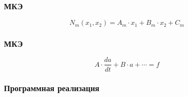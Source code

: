 \documentclass[10pt,utf8,presentation,compress]{beamer}
\begin{document}
\begin{frame}
\frametitle{МКЭ}
	\begingroup
	\Large
		\begin{equation*}
			N_m(x_1, x_2) = A_m \cdot x_1 + B_m \cdot x_2 + C_m
		\end{equation*}
	\endgroup
\end{frame}

\begin{frame}
\frametitle{МКЭ}
	\begingroup
	\huge
		\begin{equation*}
			A \cdot \frac{da}{dt} + B \cdot a + \cdots = f
		\end{equation*}
	\endgroup
\end{frame}

\begin{frame}
\frametitle{Программная реализация}
	\begin{figure}[H]
		\centering
		\hfill
	\end{figure}
\end{frame}
\end{document}

